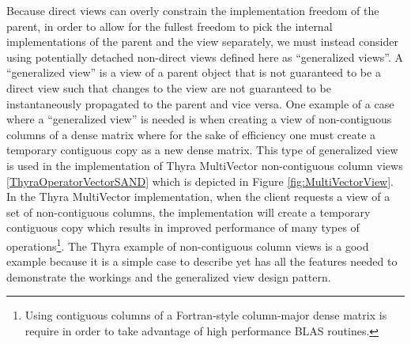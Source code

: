 \documentclass[pdf,ps2pdf,11pt]{SANDreport}
\begin{document}
Because direct views can overly constrain the implementation freedom
of the parent, in order to allow for the fullest freedom to pick the
internal implementations of the parent and the view separately, we
must instead consider using potentially detached non-direct views
defined here as ``generalized views''.  A ``generalized view'' is a
view of a parent object that is not guaranteed to be a direct view
such that changes to the view are not guaranteed to be instantaneously
propagated to the parent and vice versa.  One example of a case where
a ``generalized view'' is needed is when creating a view of
non-contiguous columns of a dense matrix where for the sake of
efficiency one must create a temporary contiguous copy as a new dense
matrix.  This type of generalized view is used in the implementation
of Thyra MultiVector non-contiguous column views
{}\ref{ThyraOperatorVectorSAND} which is depicted in Figure
{}\ref{fig:MultiVectorView}. In the Thyra MultiVector implementation,
when the client requests a view of a set of non-contiguous columns,
the implementation will create a temporary contiguous copy which
results in improved performance of many types of
operations\footnote{Using contiguous columns of a Fortran-style
column-major dense matrix is require in order to take advantage of
high performance BLAS routines.}.  The Thyra example of non-contiguous
column views is a good example because it is a simple case to describe
yet has all the features needed to demonstrate the workings and the
generalized view design pattern.
\end{document}

